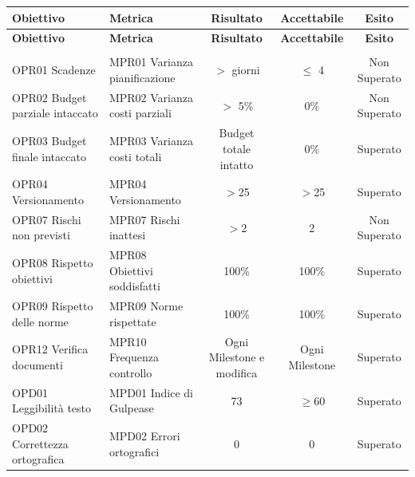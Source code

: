\documentclass[../piano_di_qualifica.tex]{subfiles}
\begin{document}
\begin{center}
	\begin{longtable}{|p{4cm}|p{4cm}|c|c|c|}
		\hline
		\rowcolor{lightgray}
		\textbf{Obiettivo}              & \textbf{Metrica}              & \textbf{Risultato}        & \textbf{Accettabile} & \textbf{Esito} \\
		\hline
		\endfirsthead

		\hline
		\rowcolor{lightgray}
		\textbf{Obiettivo}              & \textbf{Metrica}              & \textbf{Risultato}        & \textbf{Accettabile} & \textbf{Esito} \\
		\hline
		\endhead

		\hline
		\rowcolor{white}
		\multicolumn{5}{|c|}{\emph{Continua alla pagina successiva...}}                                                                     \\
		\hline
		\endfoot
		\endlastfoot

		OPR01 Scadenze                  & MPR01 Varianza pianificazione & $>$ giorni                & $\leq$ 4             & Non Superato   \\
		OPR02 Budget parziale intaccato & MPR02 Varianza costi parziali & $>$ 5\%                   & 0\%                  & Non Superato   \\
		OPR03 Budget finale intaccato   & MPR03 Varianza costi totali   & Budget totale intatto     & 0\%                  & Superato       \\
		OPR04 Versionamento             & MPR04 Versionamento           & $>$25                     & $>$25                & Superato       \\
		OPR07 Rischi non previsti       & MPR07 Rischi inattesi         & $>$2                      & 2                    & Non Superato   \\
		OPR08 Rispetto obiettivi        & MPR08 Obiettivi soddisfatti   & 100\%                     & 100\%                & Superato       \\
		OPR09 Rispetto delle norme      & MPR09 Norme rispettate        & 100\%                     & 100\%                & Superato       \\
		OPR12 Verifica documenti        & MPR10 Frequenza controllo     & Ogni Milestone e modifica & Ogni Milestone       & Superato       \\

		OPD01 Leggibilità testo         & MPD01 Indice di Gulpease      & 73                        & \(\ge 60\)           & Superato       \\
		OPD02 Correttezza ortografica   & MPD02 Errori ortografici      & 0                         & 0                    & Superato       \\


\end{longtable}
\end{center}
\end{document}
